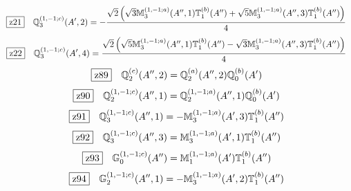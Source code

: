 \documentclass[fleqn,10pt,landscape]{jsarticle}
\begin{document}
\begin{dmath*}
\hspace*{3mm}\fbox{z21}\quad \mathbb{Q}_{3}^{(1,-1;c)}(A^{\prime},2)=- \frac{\sqrt{2} \left(\sqrt{3} \mathbb{M}_{3}^{(1,-1;a)}(A^{\prime\prime},1) \mathbb{T}_{1}^{(b)}(A^{\prime\prime}) + \sqrt{5} \mathbb{M}_{3}^{(1,-1;a)}(A^{\prime\prime},3) \mathbb{T}_{1}^{(b)}(A^{\prime\prime})\right)}{4}
\end{dmath*}
\begin{dmath*}
\hspace*{3mm}\fbox{z22}\quad \mathbb{Q}_{3}^{(1,-1;c)}(A^{\prime},4)=\frac{\sqrt{2} \left(\sqrt{5} \mathbb{M}_{3}^{(1,-1;a)}(A^{\prime\prime},1) \mathbb{T}_{1}^{(b)}(A^{\prime\prime}) - \sqrt{3} \mathbb{M}_{3}^{(1,-1;a)}(A^{\prime\prime},3) \mathbb{T}_{1}^{(b)}(A^{\prime\prime})\right)}{4}
\end{dmath*}
\begin{dmath*}
\hspace*{3mm}\fbox{z89}\quad \mathbb{Q}_{2}^{(c)}(A^{\prime\prime},2)=\mathbb{Q}_{2}^{(a)}(A^{\prime\prime},2) \mathbb{Q}_{0}^{(b)}(A^{\prime})
\end{dmath*}
\begin{dmath*}
\hspace*{3mm}\fbox{z90}\quad \mathbb{Q}_{2}^{(1,-1;c)}(A^{\prime\prime},1)=\mathbb{Q}_{2}^{(1,-1;a)}(A^{\prime\prime},1) \mathbb{Q}_{0}^{(b)}(A^{\prime})
\end{dmath*}
\begin{dmath*}
\hspace*{3mm}\fbox{z91}\quad \mathbb{Q}_{3}^{(1,-1;c)}(A^{\prime\prime},1)=- \mathbb{M}_{3}^{(1,-1;a)}(A^{\prime},3) \mathbb{T}_{1}^{(b)}(A^{\prime\prime})
\end{dmath*}
\begin{dmath*}
\hspace*{3mm}\fbox{z92}\quad \mathbb{Q}_{3}^{(1,-1;c)}(A^{\prime\prime},3)=\mathbb{M}_{3}^{(1,-1;a)}(A^{\prime},1) \mathbb{T}_{1}^{(b)}(A^{\prime\prime})
\end{dmath*}
\begin{dmath*}
\hspace*{3mm}\fbox{z93}\quad \mathbb{G}_{0}^{(1,-1;c)}(A^{\prime\prime})=\mathbb{M}_{1}^{(1,-1;a)}(A^{\prime}) \mathbb{T}_{1}^{(b)}(A^{\prime\prime})
\end{dmath*}
\begin{dmath*}
\hspace*{3mm}\fbox{z94}\quad \mathbb{G}_{2}^{(1,-1;c)}(A^{\prime\prime},1)=- \mathbb{M}_{3}^{(1,-1;a)}(A^{\prime},2) \mathbb{T}_{1}^{(b)}(A^{\prime\prime})
\end{dmath*}
\vspace{5mm}
\end{document}
